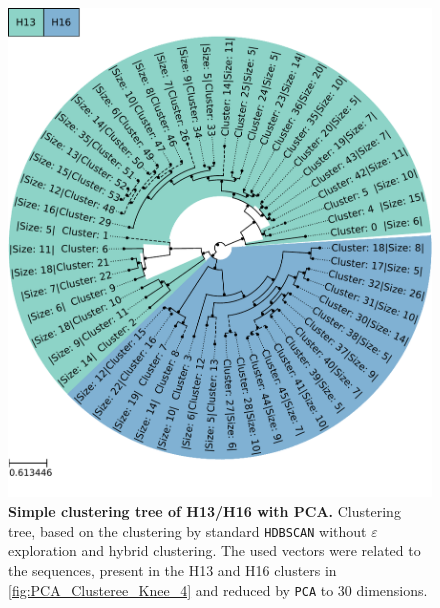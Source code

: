 \begin{figure}[!hbt]
    \centering
    \includegraphics[width=\textwidth]{PCA/Clustertree_Segment_4_H_Simple.pdf}
    \caption[Simple clustering tree of H13/H16 with PCA]{\textbf{Simple clustering tree of H13/H16 with PCA.} Clustering tree, based on the clustering by standard \texttt{HDBSCAN} without $\varepsilon$ exploration and hybrid clustering. The used vectors were related to the sequences, present in the H13 and H16 clusters in \autoref{fig:PCA_Clusteree_Knee_4} and reduced by \texttt{PCA} to 30 dimensions.}
    \label{fig:Simple_Clustertree_PCA}
\end{figure}

\vspace{1em}

